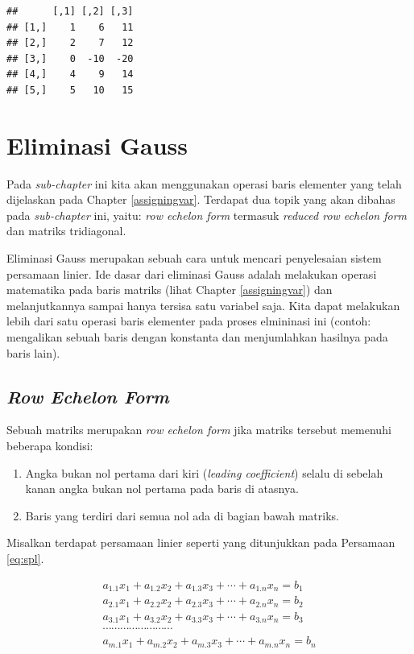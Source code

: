 \documentclass[]{book}
\providecommand{\tightlist}{%
  \setlength{\itemsep}{0pt}\setlength{\parskip}{0pt}}
\theoremstyle{definition}
\theoremstyle{definition}
\theoremstyle{definition}
\theoremstyle{remark}
\begin{document}
\begin{verbatim}
##      [,1] [,2] [,3]
## [1,]    1    6   11
## [2,]    2    7   12
## [3,]    0  -10  -20
## [4,]    4    9   14
## [5,]    5   10   15
\end{verbatim}

\hypertarget{gausselimination}{%
\section{Eliminasi Gauss}\label{gausselimination}}

Pada \emph{sub-chapter} ini kita akan menggunakan operasi baris elementer yang telah dijelaskan pada Chapter \ref{assigningvar}. Terdapat dua topik yang akan dibahas pada \emph{sub-chapter} ini, yaitu: \emph{row echelon form} termasuk \emph{reduced row echelon form} dan matriks tridiagonal.

Eliminasi Gauss merupakan sebuah cara untuk mencari penyelesaian sistem persamaan linier. Ide dasar dari eliminasi Gauss adalah melakukan operasi matematika pada baris matriks (lihat Chapter \ref{assigningvar}) dan melanjutkannya sampai hanya tersisa satu variabel saja. Kita dapat melakukan lebih dari satu operasi baris elementer pada proses elmininasi ini (contoh: mengalikan sebuah baris dengan konstanta dan menjumlahkan hasilnya pada baris lain).

\hypertarget{rowechelonform}{%
\subsection{\texorpdfstring{\emph{Row Echelon Form}}{Row Echelon Form}}\label{rowechelonform}}

Sebuah matriks merupakan \emph{row echelon form} jika matriks tersebut memenuhi beberapa kondisi:

\begin{enumerate}
\def\labelenumi{\arabic{enumi}.}
\tightlist
\item
  Angka bukan nol pertama dari kiri (\emph{leading coefficient}) selalu di sebelah kanan angka bukan nol pertama pada baris di atasnya.
\item
  Baris yang terdiri dari semua nol ada di bagian bawah matriks.
\end{enumerate}

Misalkan terdapat persamaan linier seperti yang ditunjukkan pada Persamaan \eqref{eq:spl}.

\begin{equation}
\begin{matrix}
  a_{1.1}x_1+a_{1.2}x_2+a_{1.3}x_3+\cdots+a_{1.n}x_n=b_1 \\
  a_{2.1}x_1+a_{2.2}x_2+a_{2.3}x_3+\cdots+a_{2.n}x_n=b_2 \\
  a_{3.1}x_1+a_{3.2}x_2+a_{3.3}x_3+\cdots+a_{3.n}x_n=b_3 \\
  \cdots\cdots\cdots\cdots\cdots\cdots\cdots\cdots       \\
  a_{m.1}x_1+a_{m.2}x_2+a_{m.3}x_3+\cdots+a_{m.n}x_n=b_n
 \end{matrix}
  \label{eq:spl}
\end{equation}
\end{document}
